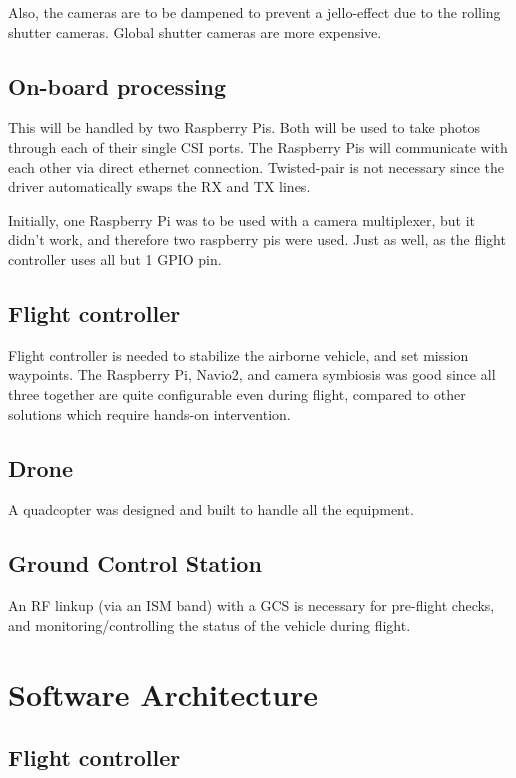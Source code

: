 Also, the cameras are to be dampened to prevent a jello-effect due to the rolling shutter cameras. Global shutter cameras are more expensive.

\subsection{On-board processing}

This will be handled by two Raspberry Pis. Both will be used to take photos through each of their single CSI ports. The Raspberry Pis will communicate with each other via direct ethernet connection. Twisted-pair is not necessary since the driver automatically swaps the RX and TX lines.

Initially, one Raspberry Pi was to be used with a camera multiplexer, but it didn't work, and therefore two raspberry pis were used. Just as well, as the flight controller uses all but 1 GPIO pin.

\subsection{Flight controller}

Flight controller is needed to stabilize the airborne vehicle, and set mission waypoints. The Raspberry Pi, Navio2, and camera symbiosis was good since all three together are quite configurable even during flight, compared to other solutions which require hands-on intervention.

\subsection{Drone}

A quadcopter was designed and built to handle all the equipment.

\subsection{Ground Control Station}

An RF linkup (via an ISM band) with a GCS is necessary for pre-flight checks, and monitoring/controlling the status of the vehicle during flight.

\section{Software Architecture}

\subsection{Flight controller}

